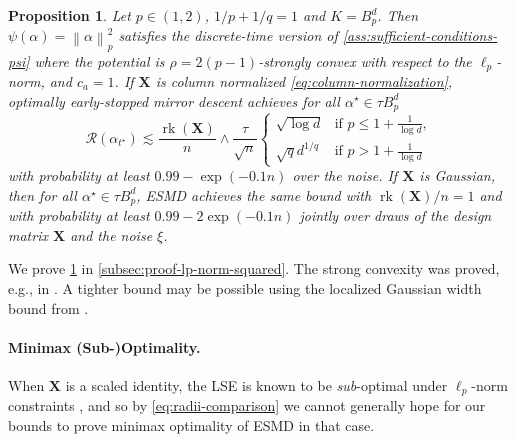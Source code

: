 \documentclass[a4paper]{article}
\newcommand{\pr}[1]{\left(#1\right)}
\newcommand{\norm}[1]{\left\|#1\right\|}
\newcommand{\X}[0]{\mathbf{X}}
\newcommand{\cR}[0]{\mathcal{R}}
\newcommand{\alphastar}{\alpha^\star}
\newcommand{\alphatstar}[0]{\alpha_{t^\star}}
\DeclareMathOperator{\rankOp}{rk}
\newcommand{\rank}[1]{\rankOp\pr{#1}}
\theoremstyle{thmstyle}
\newtheorem{proposition}[theorem]{Proposition}
\theoremstyle{defstyle}
\theoremstyle{remark}
\begin{document}
\begin{proposition}
\label{prop:lp-norm-squared}
    Let $p\in (1,2)$, $1/p+1/q =1$ and $K=B_p^d$. Then $\psi(\alpha)=\norm{\alpha}_p^2$ satisfies the discrete-time version of \cref{ass:sufficient-conditions-psi} where the potential is $\rho=2(p-1)$-strongly convex with respect to the $\ell_p$-norm, and $c_a=1$. If $\X$ is column normalized \eqref{eq:column-normalization}, optimally early-stopped mirror descent achieves for all $\alphastar\in \tau B_p^d$
    \begin{equation*}
        \cR(\alphatstar)\lesssim \frac{\rank{\X}}{n}\wedge 
        \frac{\tau}{\sqrt{n}}
        \begin{cases}
            \sqrt{\log d} & \text{if } p\leq 1+\frac{1}{\log d},\\
            \sqrt{q} d^{1/q} & \text{if } p>1+\frac{1}{\log d}
        \end{cases}
    \end{equation*}
    with probability at least $0.99-\exp(-0.1n)$ over the noise.
    If $\X$ is Gaussian, then for all $\alphastar\in \tau B_p^d$, ESMD achieves the same bound with $\rank{\X}/n=1$ and 
    with probability at least $0.99-2\exp\pr{-0.1n}$ jointly over draws of the design matrix $\X$ and the noise $\xi$.
\end{proposition}
\noindent We prove \cref{prop:lp-norm-squared} in \cref{subsec:proof-lp-norm-squared}. The strong convexity was proved, e.g., in \cite{Shalev2007online,ball1994sharp}.
A tighter bound may be possible using the localized Gaussian width bound from \cite{Gordon2007}.

\paragraph{Minimax (Sub-)Optimality.}
When $\X$ is a scaled identity, the LSE is known to be \emph{sub}-optimal under $\ell_p$-norm constraints \citep{donoho1994minimax,johnstone2017gaussian,Prasadan2024some,aolaritei2025revisiting}, and so by \cref{eq:radii-comparison} we cannot generally hope for our bounds to prove minimax optimality of ESMD in that case.
\end{document}
